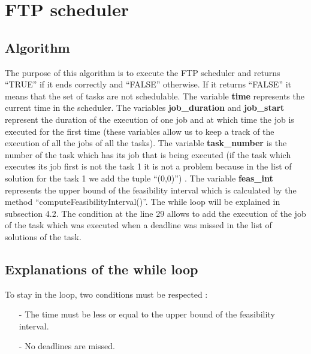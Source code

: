 \documentclass[a4paper,12pt]{article}
\begin{document}
\newpage

\section{FTP scheduler}
\subsection{Algorithm}





\smallskip
\noindent
The purpose of this algorithm is to execute the FTP scheduler and returns ``TRUE'' if it ends correctly and ``FALSE'' otherwise. If it returns ``FALSE'' it means that the set of tasks are not schedulable. The variable \textbf{time} represents the current time in the scheduler. The variables \textbf{job\_duration} and \textbf{job\_start} represent the duration of the execution of one job and at which time the job is executed for the first time (these variables allow us to keep a track of the execution of all the jobs of all the tasks). The variable \textbf{task\_number} is the number of the task which has its job that is being executed (if the task which executes its job first is not the task 1 it is not a problem because in the list of solution for the task 1 we add the tuple ``(0,0)'') . The variable \textbf{feas\_int} represents the upper bound of the feasibility interval which is calculated by the method ``computeFeasibilityInterval()''. The while loop will be explained in subsection 4.2. The condition at the line 29 allows to add the execution of the job of the task which was executed when a deadline was missed in the list of solutions of the task.

\subsection{Explanations of the while loop}

To stay in the loop, two conditions must be respected : \\
\begin{itemize}
\item[-] The time must be less or equal to the upper bound of the feasibility interval.
\item[-] No deadlines are missed. 
\end{itemize}
\end{document}
